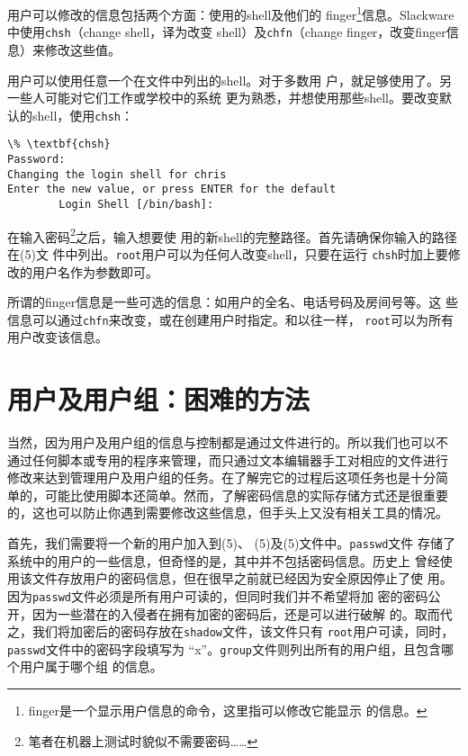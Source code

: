用户可以修改的信息包括两个方面：使用的shell及他们的
finger\footnote{finger是一个显示用户信息的命令，这里指可以修改它能显示
的信息。}信息。Slackware中使用\texttt{chsh}（change shell，译为改变
shell）及\texttt{chfn}（change finger，改变finger信息）来修改这些值。

用户可以使用任意一个在文件中列出的shell。对于多数用
户，就足够使用了。另一些人可能对它们工作或学校中的系统
更为熟悉，并想使用那些shell。要改变默认的shell，使用\texttt{chsh}：
\begin{Verbatim}[frame=single, commandchars=\\\{\}]
\% \textbf{chsh}
Password: 
Changing the login shell for chris 
Enter the new value, or press ENTER for the default
        Login Shell [/bin/bash]:
\end{Verbatim}

在输入密码\footnote{笔者在机器上测试时貌似不需要密码……}之后，输入想要使
用的新shell的完整路径。首先请确保你输入的路径在(5)文
件中列出。\texttt{root}用户可以为任何人改变shell，只要在运行
\texttt{chsh}时加上要修改的用户名作为参数即可。

所谓的finger信息是一些可选的信息：如用户的全名、电话号码及房间号等。这
些信息可以通过\texttt{chfn}来改变，或在创建用户时指定。和以往一样，
\texttt{root}可以为所有用户改变该信息。

\section{用户及用户组：困难的方法}
\label{sec:systemAdministration:usersAndGroupsHardWay}
当然，因为用户及用户组的信息与控制都是通过文件进行的。所以我们也可以不
通过任何脚本或专用的程序来管理，而只通过文本编辑器手工对相应的文件进行
修改来达到管理用户及用户组的任务。在了解完它的过程后这项任务也是十分简
单的，可能比使用脚本还简单。然而，了解密码信息的实际存储方式还是很重要
的，这也可以防止你遇到需要修改这些信息，但手头上又没有相关工具的情况。

首先，我们需要将一个新的用户加入到(5)、
(5)及(5)文件中。\texttt{passwd}文件
存储了系统中的用户的一些信息，但奇怪的是，其中并不包括密码信息。历史上
曾经使用该文件存放用户的密码信息，但在很早之前就已经因为安全原因停止了使
用。因为\texttt{passwd}文件必须是所有用户可读的，但同时我们并不希望将加
密的密码公开，因为一些潜在的入侵者在拥有加密的密码后，还是可以进行破解
的。取而代之，我们将加密后的密码存放在\texttt{shadow}文件，该文件只有
\texttt{root}用户可读，同时，\texttt{passwd}文件中的密码字段填写为
``x''。\texttt{group}文件则列出所有的用户组，且包含哪个用户属于哪个组
的信息。

